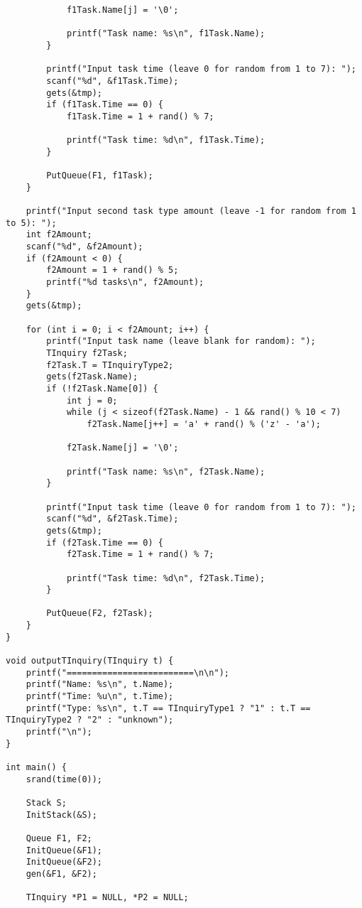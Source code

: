 \documentclass[a4paper,14pt]{extarticle}
\begin{document}
\begin{enumerate}
\begin{verbatim}
            f1Task.Name[j] = '\0';
            
            printf("Task name: %s\n", f1Task.Name);
        }

        printf("Input task time (leave 0 for random from 1 to 7): ");
        scanf("%d", &f1Task.Time);
        gets(&tmp);
        if (f1Task.Time == 0) {
            f1Task.Time = 1 + rand() % 7;
            
            printf("Task time: %d\n", f1Task.Time);
        }

        PutQueue(F1, f1Task);
    }
    
    printf("Input second task type amount (leave -1 for random from 1 to 5): ");
    int f2Amount;
    scanf("%d", &f2Amount);
    if (f2Amount < 0) {
        f2Amount = 1 + rand() % 5;
        printf("%d tasks\n", f2Amount);
    }
    gets(&tmp);

    for (int i = 0; i < f2Amount; i++) {
        printf("Input task name (leave blank for random): ");
        TInquiry f2Task;
        f2Task.T = TInquiryType2;
        gets(f2Task.Name);
        if (!f2Task.Name[0]) {
            int j = 0;
            while (j < sizeof(f2Task.Name) - 1 && rand() % 10 < 7)
                f2Task.Name[j++] = 'a' + rand() % ('z' - 'a');

            f2Task.Name[j] = '\0';
            
            printf("Task name: %s\n", f2Task.Name);
        }

        printf("Input task time (leave 0 for random from 1 to 7): ");
        scanf("%d", &f2Task.Time);
        gets(&tmp);
        if (f2Task.Time == 0) {
            f2Task.Time = 1 + rand() % 7;
            
            printf("Task time: %d\n", f2Task.Time);
        }

        PutQueue(F2, f2Task);
    }
}

void outputTInquiry(TInquiry t) {
    printf("=========================\n\n");
    printf("Name: %s\n", t.Name);
    printf("Time: %u\n", t.Time);
    printf("Type: %s\n", t.T == TInquiryType1 ? "1" : t.T == TInquiryType2 ? "2" : "unknown");
    printf("\n");
}

int main() {
    srand(time(0));

    Stack S;
    InitStack(&S);

    Queue F1, F2;
    InitQueue(&F1);
    InitQueue(&F2);
    gen(&F1, &F2);

    TInquiry *P1 = NULL, *P2 = NULL;


\end{verbatim}
\end{enumerate}
\end{document}
